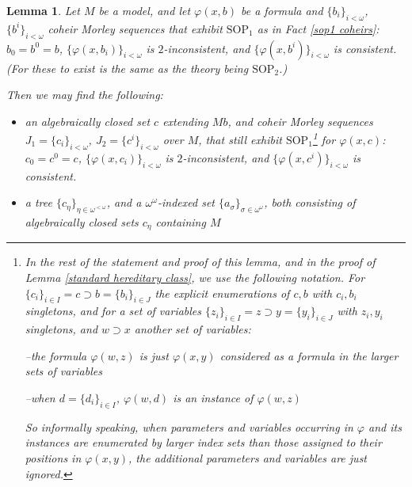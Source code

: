 \documentclass{amsart}
\newtheorem{lemma}[theorem]{Lemma}
\theoremstyle{definition}
\theoremstyle{remark}
\numberwithin{equation}{section}
\begin{document}
\begin{lemma}
\label{noninterference of algebraic closures}
Let $M$ be a model, and let $\varphi(x,b)$ be a formula and $\{b_i\}_{i < \omega} $, $\{b^i\}_{i < \omega}$  coheir Morley sequences that exhibit $\mathrm{SOP}_{1}$ as in Fact \ref{sop1 coheirs}: $b_0 = b^0 = b$, $\{\varphi(x, b_{i})\}_{i < \omega}$ is $2$-inconsistent, and $\{\varphi(x, b^{i})\}_{i < \omega}$ is consistent. (For these to exist is the same as the theory being $\mathrm{SOP}_{2}$.)


Then we may find the following:

\begin{itemize}
    \item an algebraically closed set $c$ extending $Mb$, and coheir Morley sequences $J_{1} = \{c_{i}\}_{i < \omega}$, $J_{2}=\{c^{i}\}_{i < \omega}$ over $M$, that still exhibit $\mathrm{SOP}_{1}$\footnote{In the rest of the statement and proof of this lemma, and in the proof of Lemma \ref{standard hereditary class}, we use the following notation. For $\{c_i\}_{i \in I} = c \supset b= \{b_i\}_{i \in J}$ the explicit enumerations of $ c, b$ with $ c_i, b_i$ singletons, and for a set of variables $\{z_i\}_{i \in I} = z \supset y= \{y_i\}_{i \in J}$ with $z_i, y_i$ singletons, and $w \supset x$ another set of variables:


--the formula $\varphi(w, z)$ is just $\varphi(x, y)$ considered as a formula in the larger sets of variables


--when $d = \{d_{i}\}_{i \in I}$, $\varphi(w, d)$ is an instance of $\varphi(w, z)$


So informally speaking, when parameters and variables occurring in $\varphi$ and its instances are enumerated by larger index sets than those assigned to their positions in $\varphi(x, y)$, the additional parameters and variables are just ignored.} for $\varphi(x, c)$: $c_0 = c^0 = c$, $\{\varphi(x, c_{i})\}_{i < \omega}$ is $2$-inconsistent, and $\{\varphi(x, c^{i})\}_{i < \omega}$ is consistent. 


\item a tree $\{c_{\eta}\}_{\eta \in \omega^{< \omega}}$, and a $\omega^{\omega}$-indexed set $\{a_{\sigma}\}_{\sigma \in \omega^{\omega}}$, both consisting of algebraically closed sets $c_{\eta}$ containing $M$

\end{itemize}









\end{lemma}
\end{document}
